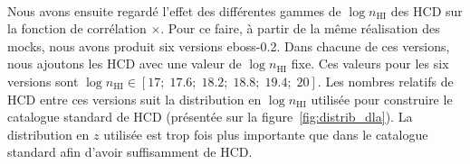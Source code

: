 \documentclass[11pt, twoside, a4paper, openright]{report}
\begin{document}
\paragraph{}
Nous avons ensuite regardé l'effet des différentes gammes de $\log n_{\mathrm{HI}}$ des HCD sur la fonction de corrélation \lya{}$\times$\lya{}.
Pour ce faire, à partir de la même réalisation des mocks, nous avons produit six versions eboss-0.2. Dans chacune de ces versions, nous ajoutons les HCD avec une valeur de $\log n_{\mathrm{HI}}$ fixe. Ces valeurs pour les six versions sont $\log n_{\mathrm{HI}} \in [\num{17};\;\num{17.6};\;\num{18.2};\;\num{18.8};\;\num{19.4};\;\num{20}]$. Les nombres relatifs de HCD entre ces versions suit la distribution en $\log n_{\mathrm{HI}}$ utilisée pour construire le catalogue standard de HCD (présentée sur la figure~\ref{fig:distrib_dla}). La distribution en $z$ utilisée est trop fois plus importante que dans le catalogue standard afin d'avoir suffisamment de HCD.








% 
\printbibliography
\end{document}
